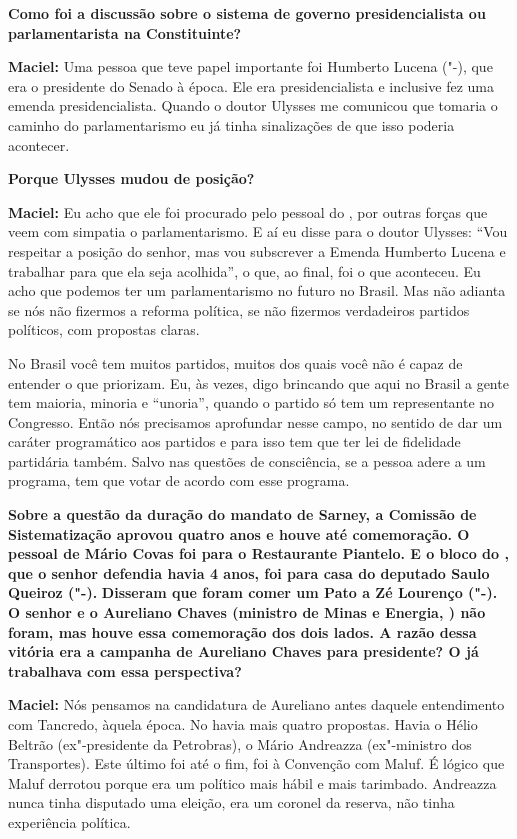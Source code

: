 \textbf{Como foi a discussão sobre o sistema de governo presidencialista
ou parlamentarista na Constituinte?}

\textbf{Maciel:} Uma pessoa que teve papel importante foi Humberto
Lucena ("-), que era o presidente do Senado à época. Ele era
presidencialista e inclusive fez uma emenda presidencialista. Quando o
doutor Ulysses me comunicou que tomaria o caminho do parlamentarismo eu
já tinha sinalizações de que isso poderia acontecer.

\textbf{Porque Ulysses mudou de posição?}

\textbf{Maciel:} Eu acho que ele foi procurado pelo pessoal do , por
outras forças que veem com simpatia o parlamentarismo. E aí eu disse
para o doutor Ulysses: ``Vou respeitar a posição do senhor, mas vou
subscrever a Emenda Humberto Lucena e trabalhar para que ela seja
acolhida'', o que, ao final, foi o que aconteceu. Eu acho que podemos
ter um parlamentarismo no futuro no Brasil. Mas não adianta se nós não
fizermos a reforma política, se não fizermos verdadeiros partidos
políticos, com propostas claras.

No Brasil você tem muitos partidos, muitos dos quais você não é capaz de
entender o que priorizam. Eu, às vezes, digo brincando que aqui no
Brasil a gente tem maioria, minoria e ``unoria'', quando o partido só
tem um representante no Congresso. Então nós precisamos aprofundar nesse
campo, no sentido de dar um caráter programático aos partidos e para
isso tem que ter lei de fidelidade partidária também. Salvo nas questões
de consciência, se a pessoa adere a um programa, tem que votar de acordo
com esse programa.

\textbf{Sobre a questão da duração do mandato de Sarney, a Comissão de
Sistematização aprovou quatro anos e houve até comemoração. O pessoal de
Mário Covas foi para o Restaurante Piantelo. E o bloco do , que o
senhor defendia havia 4 anos, foi para casa do deputado Saulo Queiroz
("-).} \textbf{Disseram que foram comer um Pato a Zé Lourenço
("-). O senhor e o Aureliano Chaves (ministro de Minas e Energia,
) não foram, mas houve essa comemoração dos dois lados. A razão dessa
vitória era a campanha de Aureliano Chaves para presidente? O  já
trabalhava com essa perspectiva?}

\textbf{Maciel:} Nós pensamos na candidatura de Aureliano antes daquele
entendimento com Tancredo, àquela época. No  havia mais quatro
propostas. Havia o Hélio Beltrão (ex"-presidente da Petrobras), o Mário
Andreazza (ex"-ministro dos Transportes). Este último foi até o fim, foi
à Convenção com Maluf. É lógico que Maluf derrotou porque era um
político mais hábil e mais tarimbado. Andreazza nunca tinha disputado
uma eleição, era um coronel da reserva, não tinha experiência política.

